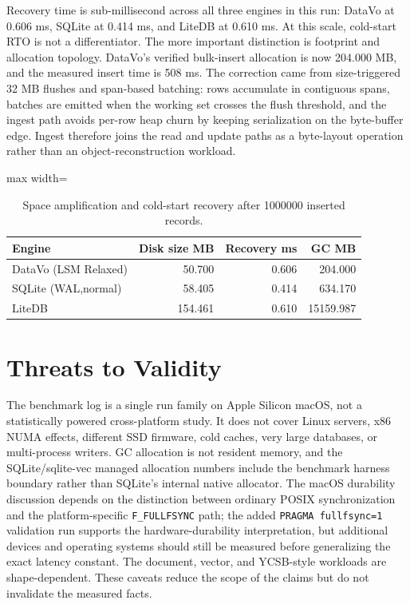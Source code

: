 \documentclass[11pt]{article}
\begin{document}
Recovery time is sub-millisecond across all three engines in this run: DataVo at \num{0.606} ms, SQLite at \num{0.414} ms, and LiteDB at \num{0.610} ms. At this scale, cold-start RTO is not a differentiator. The more important distinction is footprint and allocation topology. DataVo's verified bulk-insert allocation is now \num{204.000} MB, and the measured insert time is \num{508} ms. The correction came from size-triggered \num{32} MB flushes and span-based batching: rows accumulate in contiguous spans, batches are emitted when the working set crosses the flush threshold, and the ingest path avoids per-row heap churn by keeping serialization on the byte-buffer edge. Ingest therefore joins the read and update paths as a byte-layout operation rather than an object-reconstruction workload.

\begin{table}[H]
\caption{Space amplification and cold-start recovery after \num{1000000} inserted records.}
\label{tab:space-recovery-final}
\centering
\small
\begin{adjustbox}{max width=\textwidth}
\begin{tabular}{lrrr}
\toprule
Engine & Disk size MB & Recovery ms & GC MB \\
\midrule
DataVo (LSM Relaxed) & 50.700 & 0.606 & 204.000 \\
SQLite (WAL,normal) & 58.405 & 0.414 & 634.170 \\
LiteDB & 154.461 & 0.610 & 15159.987 \\
\bottomrule
\end{tabular}
\end{adjustbox}
\end{table}

\FloatBarrier

\section{Threats to Validity}
The benchmark log is a single run family on Apple Silicon macOS, not a statistically powered cross-platform study. It does not cover Linux servers, x86 NUMA effects, different SSD firmware, cold caches, very large databases, or multi-process writers. GC allocation is not resident memory, and the SQLite/sqlite-vec managed allocation numbers include the benchmark harness boundary rather than SQLite's internal native allocator. The macOS durability discussion depends on the distinction between ordinary POSIX synchronization and the platform-specific \mbox{\texttt{F\_FULLFSYNC}} path; the added \texttt{PRAGMA fullfsync=1} validation run supports the hardware-durability interpretation, but additional devices and operating systems should still be measured before generalizing the exact latency constant. The document, vector, and YCSB-style workloads are shape-dependent. These caveats reduce the scope of the claims but do not invalidate the measured facts.
\end{document}
